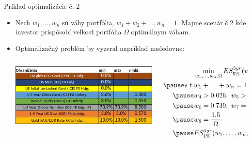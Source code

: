 \documentclass{Bredelebeamer}
\begin{document}
\begin{frame}{Príklad optimalizácie č. 2}
	\begin{itemize}
		\item Nech $w_1, \ldots, w_n$ sú váhy portfólia, $w_1 + w_2 + \ldots, w_n = 1$. Majme scenár č.2 kde investor prispôsobí veľkosť portfólia $\Omega$ optimálnym váham.
		\item Optimalizačný problém by vyzeral napríklad nasledovne:
		\begin{columns}
			\begin{column}{0.48\textwidth}
				\centering
				\includegraphics[width=1.1\textwidth]{Figures/constraints}
			\end{column}
			\begin{column}{0.48\textwidth}
				\[
				\begin{aligned}
				&\min_{w_1, \ldots, w_n, \Omega}ES_{5\%}^{5yr}(w_1, \ldots, w_n, \Omega) \\\pause
				s.t. &w_1 + \ldots + w_n = 1 \\\pause
				&w_4 > 0.026, \ w_5 > 0.03 \\\pause
				&w_6 = 0.739, \ w_7 = 0.05, \ w_8 = 0.13 \\\pause
				&w_8 = \frac{1.5}{\Omega}\\\pause
				&ES_{1\%}^{1yr}(w_1, \ldots, w_n, \Omega) \leq 0.4
				\end{aligned}
				\]
			\end{column}
		\end{columns}
	\end{itemize}
\end{frame}
\end{document}
